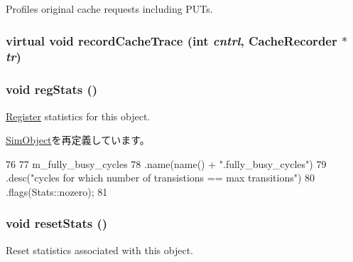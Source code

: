 Profiles original cache requests including PUTs. \hypertarget{classAbstractController_a4ca8c1956ef762ec2219ff377a68c7ba}{
\subsubsection[{recordCacheTrace}]{\setlength{\rightskip}{0pt plus 5cm}virtual void recordCacheTrace (int {\em cntrl}, \/  {\bf CacheRecorder} $\ast$ {\em tr})}}
\label{classAbstractController_a4ca8c1956ef762ec2219ff377a68c7ba}
\hypertarget{classAbstractController_a4dc637449366fcdfc4e764cdf12d9b11}{
\subsubsection[{regStats}]{\setlength{\rightskip}{0pt plus 5cm}void regStats ()}}
\label{classAbstractController_a4dc637449366fcdfc4e764cdf12d9b11}
\hyperlink{classRegister}{Register} statistics for this object. 

\hyperlink{classSimObject_a4dc637449366fcdfc4e764cdf12d9b11}{SimObject}を再定義しています。


\begin{DoxyCode}
76 {
77     m_fully_busy_cycles
78         .name(name() + ".fully_busy_cycles")
79         .desc("cycles for which number of transistions == max transitions")
80         .flags(Stats::nozero);
81 }
\end{DoxyCode}
\hypertarget{classAbstractController_a9820f96c5343e42ad3fcbc97b83f59d5}{
\subsubsection[{resetStats}]{\setlength{\rightskip}{0pt plus 5cm}void resetStats ()}}
\label{classAbstractController_a9820f96c5343e42ad3fcbc97b83f59d5}
Reset statistics associated with this object. 

